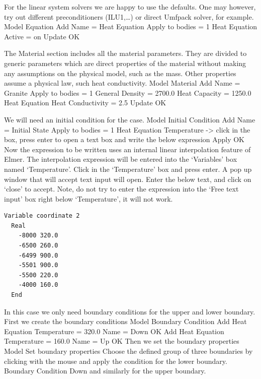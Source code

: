 For the linear system solvers we are happy to use the defaults. One may however, try out different
preconditioners (ILU1,\ldots) or direct Umfpack solver, for example.
\ttbegin
Model
  Equation
    Add 
      Name = Heat Equation
      Apply to bodies = 1
      Heat Equation
        Active = on
  Update   
  OK
\ttend        

The Material section includes all the material parameters.
They are divided to generic parameters which are direct properties of the material
without making any assumptions on the physical model, such as the mass. Other properties assume
a physical law, such heat conductivity.
\ttbegin
Model
  Material
    Add 
      Name = Granite
      Apply to bodies = 1 
      General    
        Density = 2700.0
        Heat Capacity = 1250.0
      Heat Equation
        Heat Conductivity = 2.5
    Update
    OK
\ttend

We will need an initial condition for the case. 
\ttbegin
Model
  Initial Condition
    Add 
      Name = Initial State
      Apply to bodies = 1
      Heat Equation
        Temperature -> click in the box, press enter to open a text box and write the below expression
    Apply
    OK
\ttend    
Now the expression to be written uses an internal linear interpolation feature of Elmer.  The 
interpolation expression will be entered into the `Variables' box named `Temperature'.  Click in
the `Temperature' box and press enter.  A pop up window that will accept text input will open. 
Enter the below text, and click on `close' to accept.  Note, do not try to enter the expression
into the `Free text input' box right below `Temperature', it will not work.
\begin{verbatim}
Variable coordinate 2
  Real
    -8000 320.0
    -6500 260.0
    -6499 900.0
    -5501 900.0
    -5500 220.0
    -4000 160.0
  End
\end{verbatim}

In this case we only need boundary conditions for the upper and lower boundary.
First we create the boundary conditions
\ttbegin
Model
  Boundary Condition
    Add 
      Heat Equation
        Temperature = 320.0
      Name = Down
      OK
    Add 
      Heat Equation
        Temperature = 160.0
      Name = Up
      OK
\ttend   
Then we set the boundary properties 
\ttbegin
Model 
  Set boundary properties  
\ttend
Choose the defined group of three boundaries by clicking with the mouse
and apply the condition for the lower boundary.
\ttbegin
Boundary Condition
  Down
\ttend
and similarly for the upper boundary. 


